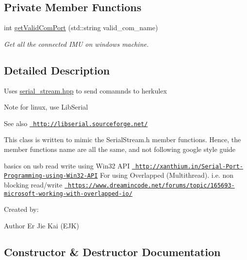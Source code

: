 \subsection*{Private Member Functions}
\begin{DoxyCompactItemize}
\item 
int \mbox{\hyperlink{class_herkulex_driver_a88fc6f6f61129cd1f8133b4d263bf6cc}{get\+Valid\+Com\+Port}} (std\+::string valid\+\_\+com\+\_\+name)
\begin{DoxyCompactList}\small\item\em Get all the connected I\+MU on windows machine. \end{DoxyCompactList}\end{DoxyCompactItemize}


\subsection{Detailed Description}
Uses \mbox{\hyperlink{serial__stream_8hpp_source}{serial\+\_\+stream.\+hpp}} to send comamnds to herkulex

\begin{DoxyNote}{Note}
for linux, use Lib\+Serial 
\end{DoxyNote}
\begin{DoxySeeAlso}{See also}
\href{http://libserial.sourceforge.net/}{\texttt{ http\+://libserial.\+sourceforge.\+net/}}
\end{DoxySeeAlso}
This class is written to mimic the Serial\+Stream.\+h member functions. Hence, the member functions name are all the same, and not following google style guide

basics on usb read write using Win32 A\+PI \href{http://xanthium.in/Serial-Port-Programming-using-Win32-API}{\texttt{ http\+://xanthium.\+in/\+Serial-\/\+Port-\/\+Programming-\/using-\/\+Win32-\/\+A\+PI}} For using Overlapped (Multithread). i.\+e. non blocking read/write \href{https://www.dreamincode.net/forums/topic/165693-microsoft-working-with-overlapped-io/}{\texttt{ https\+://www.\+dreamincode.\+net/forums/topic/165693-\/microsoft-\/working-\/with-\/overlapped-\/io/}}

Created by\+: \begin{DoxyAuthor}{Author}
Er Jie Kai (E\+JK) 
\end{DoxyAuthor}


\subsection{Constructor \& Destructor Documentation}
\mbox{\label{class_herkulex_driver_a7c08f5e017f2d907b252b2c93bcfc6a8}} 
